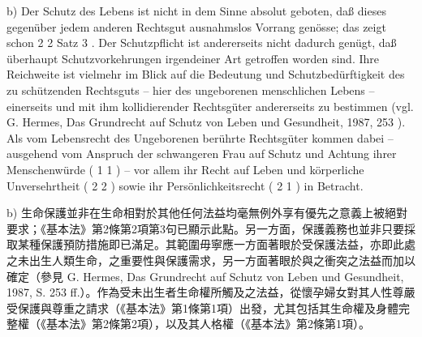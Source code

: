 \documentclass[12pt]{article}
\begin{document}
\begin{sourcepara}[title={原文D.44}]
b) Der Schutz des Lebens ist nicht in dem Sinne absolut geboten, daß dieses gegenüber jedem anderen Rechtsgut ausnahmslos Vorrang genösse; das zeigt schon \abbrArt{} 2 \abbrAbs{} 2 Satz 3 \abbrGG{}\ggfnArtTwoTwoThreeDE{}. Der Schutzpflicht ist andererseits nicht dadurch genügt, daß überhaupt Schutzvorkehrungen irgendeiner Art getroffen worden sind. Ihre Reichweite ist vielmehr im Blick auf die Bedeutung und Schutzbedürftigkeit des zu schützenden Rechtsguts -- hier des ungeborenen menschlichen Lebens -- einerseits und mit ihm kollidierender Rechtsgüter andererseits zu bestimmen (vgl. G. Hermes, Das Grundrecht auf Schutz von Leben und Gesundheit, 1987, \abbrS{} 253 \abbrFF{}). Als vom Lebensrecht des Ungeborenen berührte Rechtsgüter kommen dabei -- ausgehend vom Anspruch der schwangeren Frau auf Schutz und Achtung ihrer Menschenwürde (\abbrArt{} 1 \abbrAbs{} 1 \abbrGG{}\ggfnArtOneOneDE{}) -- vor allem ihr Recht auf Leben und körperliche Unversehrtheit (\abbrArt{} 2 \abbrAbs{} 2 \abbrGG{}\ggfnArtTwoTwoDE{}) sowie ihr Persönlichkeitsrecht (\abbrArt{} 2 \abbrAbs{} 1 \abbrGG{}\ggfnArtTwoOneDE{}) in Betracht.
\end{sourcepara}
\begin{transpara}
b) 生命保護並非在生命相對於其他任何法益均毫無例外享有優先之意義上被絕對要求；《基本法》第2條第2項第3句\ggfnArtTwoTwoThreeZH{}已顯示此點。另一方面，保護義務也並非只要採取某種保護預防措施即已滿足。其範圍毋寧應一方面著眼於受保護法益，亦即此處之未出生人類生命，之重要性與保護需求，另一方面著眼於與之衝突之法益而加以確定（參見 G. Hermes, Das Grundrecht auf Schutz von Leben und Gesundheit, 1987, S. 253 ff.）。作為受未出生者生命權所觸及之法益，從懷孕婦女對其人性尊嚴受保護與尊重之請求（《基本法》第1條第1項\ggfnArtOneOneZH{}）出發，尤其包括其生命權及身體完整權（《基本法》第2條第2項\ggfnArtTwoTwoZH{}），以及其人格權（《基本法》第2條第1項\ggfnArtTwoOneZH{}）。
\end{transpara}
\end{document}
